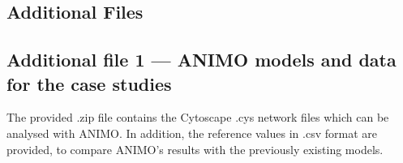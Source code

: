 \documentclass{bmcart}
\begin{document}
\begin{backmatter}






\clearpage

\section*{Additional Files}
  \subsection*{Additional file 1 --- ANIMO models and data for the case studies}
      The provided .zip file contains the Cytoscape .cys network files which can be analysed
      with ANIMO. In addition, the reference values in .csv format are provided, to compare
      ANIMO's results with the previously existing models.


\end{backmatter}



\appendix
\clearpage
\setcounter{figure}{0}
\setcounter{table}{0}
\setcounter{page}{1}
\onecolumn



%
\end{document}
